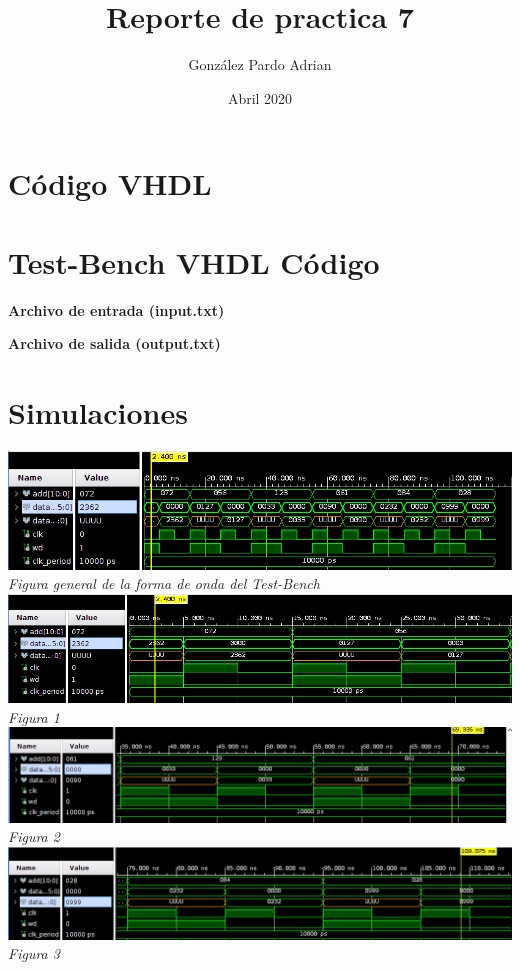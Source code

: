 \documentclass[8pt,executivepaper]{article}
\author{González Pardo Adrian}
\date{Abril 2020}
\title{Reporte de practica 7}
\begin{document}
\maketitle
\section{Código VHDL}

\section{Test-Bench VHDL Código}

\textbf{Archivo de entrada (input.txt)}

\textbf{Archivo de salida (output.txt)}

\section{Simulaciones}
\begin{center}
  \includegraphics[scale=0.5]{imgs/imgGral.png}\\
  \textit{Figura general de la forma de onda del Test-Bench}
  \includegraphics[scale=0.5]{imgs/primera.png}\\
  \textit{Figura 1}\\
  \includegraphics[scale=0.45]{imgs/segunda.png}\\
  \textit{Figura 2}\\
  \includegraphics[scale=0.45]{imgs/tercera.png}\\
  \textit{Figura 3}
\end{center}
\end{document}
